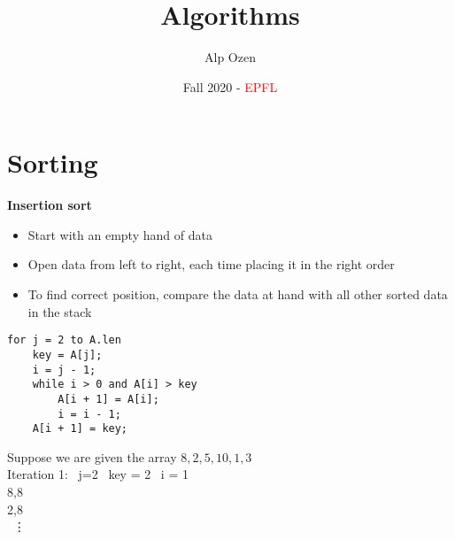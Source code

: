 \documentclass[titlepage]{article}
\title{\textbf{Algorithms}}
\author{Alp Ozen}
\date{Fall 2020 - \textcolor{red}{EPFL}}
\numberwithin{equation}{subsection}
\begin{document}
\maketitle
\tableofcontents

\clearpage

\section{Sorting}

\textbf{Insertion sort}

\begin{tcolorbox}
\begin{itemize}
  \item Start with an empty hand of data
  \item Open data from left to right, each time placing it in the right order
  \item To find correct position, compare the data at hand with all other sorted data in the stack 
\end{itemize}
\end{tcolorbox}

\begin{cs}
\begin{verbatim}
for j = 2 to A.len
    key = A[j];
    i = j - 1; 
    while i > 0 and A[i] > key 
        A[i + 1] = A[i];
        i = i - 1;
    A[i + 1] = key;
\end{verbatim}

\end{cs}

\begin{example}
Suppose we are given the array $8,2,5,10,1,3$
\\

Iteration 1:
\
j=2 \ key = 2 \ i = 1
\\

8,8
\\

2,8
\\

\ \vdots
\end{example}
\end{document}
